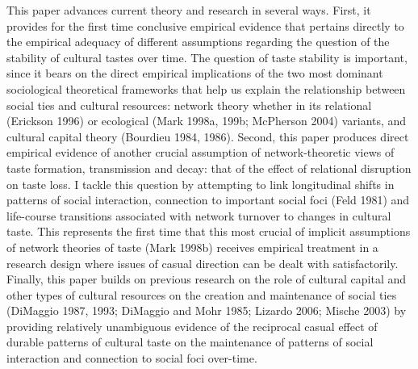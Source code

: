 \documentclass[
]{article}
\begin{document}
This paper advances current theory and research in several ways. First, it provides for the first time conclusive empirical evidence that pertains directly to the empirical adequacy of different assumptions regarding the question of the stability of cultural tastes over time. The question of taste stability is important, since it bears on the direct empirical implications of the two most dominant sociological theoretical frameworks that help us explain the relationship between social ties and cultural resources: network theory whether in its relational (Erickson 1996) or ecological (Mark 1998a, 199b; McPherson 2004) variants, and cultural capital theory (Bourdieu 1984, 1986). Second, this paper produces direct empirical evidence of another crucial assumption of network-theoretic views of taste formation, transmission and decay: that of the effect of relational disruption on taste loss. I tackle this question by attempting to link longitudinal shifts in patterns of social interaction, connection to important social foci (Feld 1981) and life-course transitions associated with network turnover to changes in cultural taste. This represents the first time that this most crucial of implicit assumptions of network theories of taste (Mark 1998b) receives empirical treatment in a research design where issues of casual direction can be dealt with satisfactorily. Finally, this paper builds on previous research on the role of cultural capital and other types of cultural resources on the creation and maintenance of social ties (DiMaggio 1987, 1993; DiMaggio and Mohr 1985; Lizardo 2006; Mische 2003) by providing relatively unambiguous evidence of the reciprocal casual effect of durable patterns of cultural taste on the maintenance of patterns of social interaction and connection to social foci over-time.
\end{document}
